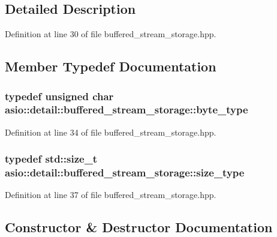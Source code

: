 \subsection{Detailed Description}


Definition at line 30 of file buffered\+\_\+stream\+\_\+storage.\+hpp.



\subsection{Member Typedef Documentation}
\hypertarget{classasio_1_1detail_1_1buffered__stream__storage_a8c60fd3097ec6de528a228a91d671f9d}{}
\subsubsection[{byte\+\_\+type}]{\setlength{\rightskip}{0pt plus 5cm}typedef unsigned char {\bf asio\+::detail\+::buffered\+\_\+stream\+\_\+storage\+::byte\+\_\+type}}\label{classasio_1_1detail_1_1buffered__stream__storage_a8c60fd3097ec6de528a228a91d671f9d}


Definition at line 34 of file buffered\+\_\+stream\+\_\+storage.\+hpp.

\hypertarget{classasio_1_1detail_1_1buffered__stream__storage_a1307072f53f7298ff9ce12e1d1f483cf}{}
\subsubsection[{size\+\_\+type}]{\setlength{\rightskip}{0pt plus 5cm}typedef std\+::size\+\_\+t {\bf asio\+::detail\+::buffered\+\_\+stream\+\_\+storage\+::size\+\_\+type}}\label{classasio_1_1detail_1_1buffered__stream__storage_a1307072f53f7298ff9ce12e1d1f483cf}


Definition at line 37 of file buffered\+\_\+stream\+\_\+storage.\+hpp.



\subsection{Constructor \& Destructor Documentation}
\hypertarget{classasio_1_1detail_1_1buffered__stream__storage_a8cfe52167d4f4ec4585f7e88debed158}{}
